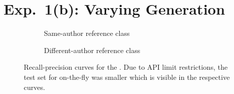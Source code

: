 \section{Exp.\ 1(b): Varying \Imp{} Generation}

\begin{figure}[H]
  \centering
  \begin{subfigure}{\textwidth}
    \centering
    
    \caption{Same-author reference class}
    \label{fig:student_essays_same_author}
  \end{subfigure}
  \begin{subfigure}{\textwidth}
    \centering
    
    \caption{Different-author reference class}
    \label{fig:student_essays_different_author}
  \end{subfigure}
  \caption[Recall-precision curves for the \dataStudent{}.]{Recall-precision curves for the \dataStudent{}. 
Due to API limit restrictions, the test set for on-the-fly was smaller which is visible in the respective curves.
  }
  \label{fig:diff_imp_gen_student_essays}
\end{figure}

